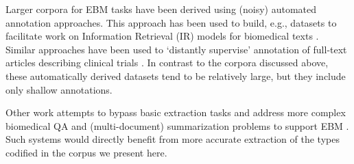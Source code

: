 \documentclass[11pt,a4paper]{article}
\begin{document}

Larger corpora for EBM tasks have been derived using (noisy) automated annotation approaches. This approach has been used to build, e.g., datasets to facilitate work on Information Retrieval (IR) models for biomedical texts 
\cite{scells2017test,chung2009sentence,boudin2010positional}. Similar approaches have been used to `distantly supervise' annotation of full-text articles describing clinical trials \cite{wallace2016extracting}. In contrast to the corpora discussed above, these automatically derived datasets tend to be relatively large, but they include only shallow annotations.






Other work attempts to bypass basic extraction tasks and address more complex biomedical QA and (multi-document) summarization problems to support EBM \cite{demner2007answering,molla2011development,abacha2015means}. Such systems would directly benefit from more accurate extraction of the types %
codified in the corpus we present here.

\end{document}
